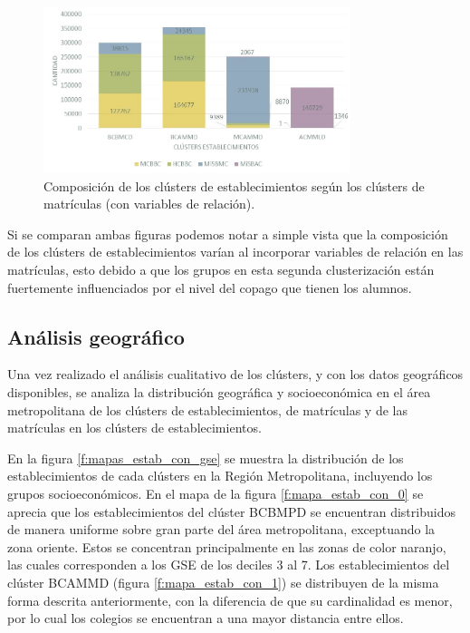\begin{figure}[H]
    \centering
    \includegraphics[width=0.8\textwidth]{images/matriculas/Mat_con_estab.jpg}
    \caption{Composición de los clústers de establecimientos según los clústers de matrículas (con variables de relación).}
    \label{fig:mat_con_estab}
\end{figure}

Si se comparan ambas figuras podemos notar a simple vista que la composición de los clústers de establecimientos varían al incorporar variables de relación en las matrículas, esto debido a que los grupos en esta segunda clusterización están fuertemente influenciados por el nivel del copago que tienen los alumnos.

\subsection{Análisis geográfico}

Una vez realizado el análisis cualitativo de los clústers, y con los datos geográficos disponibles, se analiza la distribución geográfica y socioeconómica en el área metropolitana de los clústers de establecimientos, de matrículas y de las matrículas en los clústers de establecimientos.

En la figura \ref{f:mapas_estab_con_gse} se muestra la distribución de los establecimientos de cada clústers en la Región Metropolitana, incluyendo los grupos socioeconómicos. En el mapa de la figura \ref{f:mapa_estab_con_0} se aprecia que los establecimientos del clúster BCBMPD se encuentran distribuidos de manera uniforme sobre gran parte del área metropolitana, exceptuando la zona oriente. Estos se concentran principalmente en las zonas de color naranjo, las cuales corresponden a los GSE de los deciles 3 al 7. Los establecimientos del clúster BCAMMD (figura \ref{f:mapa_estab_con_1}) se distribuyen de la misma forma descrita anteriormente, con la diferencia de que su cardinalidad es menor, por lo cual los colegios se encuentran a una mayor distancia entre ellos.

